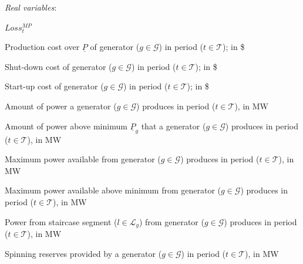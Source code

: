 \vspace{1em}
\noindent\textit{Real variables}:%
\begin{labeling}{$Loss^{MP}_{t}$}
\setlength\itemsep{0.1em}
\item[$c_{gt}^{\text{p}}$] Production cost over $\underline{P}$ of generator ($g\in\mathcal{G}$)  in period ($t\in\mathcal{T}$); in \$
\item[$c_{gt}^{\text{SD}}$] Shut-down cost of generator ($g\in\mathcal{G}$) in period ($t\in\mathcal{T}$); in \$
\item[$c_{gt}^{\text{SU}}$] Start-up cost of generator ($g\in\mathcal{G}$) in period ($t\in\mathcal{T}$); in \$
\item[$p_{gt}$] Amount of power a generator ($g\in\mathcal{G}$) produces in period ($t\in\mathcal{T}$), in MW 
\item[$p'_{gt}$] Amount of power above minimum $\underline{P}_g$ that a generator ($g\in\mathcal{G}$) produces in period ($t\in\mathcal{T}$), in MW 
\item[$\overline{p}_{gt}$] Maximum power available from generator ($g\in\mathcal{G}$) produces in period ($t\in\mathcal{T}$), in MW 
\item[$\overline{p}'_{gt}$] Maximum power available above minimum from generator ($g\in\mathcal{G}$) produces in period ($t\in\mathcal{T}$), in MW 
\item[${p}^{l}_{gt}$] Power from staircase segment ($l\in\mathcal{L}_g$) 
 from generator ($g\in\mathcal{G}$) produces in period ($t\in\mathcal{T}$), in MW 
\item[$r_{gt}$] Spinning reserves provided by a generator ($g\in\mathcal{G}$) in period ($t\in\mathcal{T}$), in MW 
\end{labeling}

